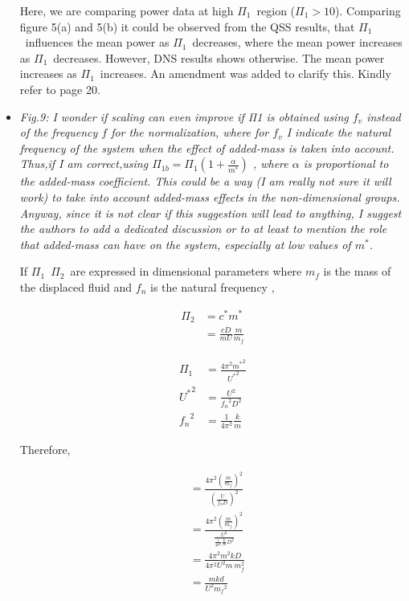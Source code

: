 \documentclass[]{article}
\newcommand{\ustar}{\ensuremath{U^{*}}}
\newcommand{\mstar}{\ensuremath{m^{*}}}
\newcommand{\cstar}{\ensuremath{c^{*}}}
\newcommand{\massstiff}{\ensuremath{\Pi_1}}
\newcommand{\massdamp}{\ensuremath{\Pi_2}}
\begin{document}
\begin{itemize}
Here, we are comparing power data at high \massstiff \ region ($\massstiff> 10$). Comparing figure 5(a) and 5(b) it could be 
observed from the QSS results, that  \massstiff \ influences the mean power as \massstiff \ decreases, where the mean power increases as \massstiff \ decreases. However, DNS results shows otherwise. The mean power increases as \massstiff \ increases. An amendment was added to clarify this. Kindly refer to page 20.     

\item \emph{ Fig.9: I wonder if scaling can even improve if Π1 is obtained using $f_v$
instead of the frequency $f$ for the normalization, where for $f_v$ I indicate
the natural frequency of the system when the effect of added-mass is taken into account. Thus,if I am correct,using $\Pi_{1b}= \massstiff \left(1+ \frac{\alpha}{\mstar}\right)$ , where $\alpha$ is proportional to the added-mass coefficient. This could be a way (I am really not sure it will work) to take into account added-mass effects in the non-dimensional groups. Anyway, since it is not clear if this suggestion will lead to anything, I suggest the authors to add a dedicated discussion or to at least to mention the role that added-mass can have on the system, especially at low values of \mstar.}

If \massstiff \ \massdamp \ are expressed in dimensional parameters where $m_{f}$ is  the mass of the displaced fluid and $f_n$ is the natural frequency , 



\begin{equation*} 
\begin{split}
\massdamp & = \cstar \mstar \\
 & = \frac{cD}{mU} \frac{m}{m_{f}}
\end{split}
\end{equation*}


\begin{equation*} 
\begin{split}
\massstiff & = \frac{4 {\pi}^2 {\mstar}^2}{{\ustar}^2} \\
 {\ustar}^2 & = \frac{U^2}{{f_n}^2 D^2} \\
 {f_{n}}^2 & = \frac{1}{4{\pi}^2}\frac{k}{m}
\end{split}
\end{equation*}

Therefore, 

\begin{equation*}
\begin{split}
	 & = \frac{4 {\pi}^2 {\left(\frac{m}{m_f}\right)}^2}{{\left(\frac{U}{{f_n} D}\right)}^2} \\
	 & = \frac{4 {\pi}^2 {\left(\frac{m}{m_f}\right)}^2}{{\frac{U^2}{{\frac{1}{4{\pi}^2}\frac{k}{m}} D^2}}} \\
     & = \frac{4{\pi}^2 m^2 k D}{4 {\pi}^2 U^2 m \ m _f^2} \\
     & = \frac{m k d}{U^2 {m_f}^2} 
\end{split}
\end{equation*}


\end{itemize}
\end{document}

